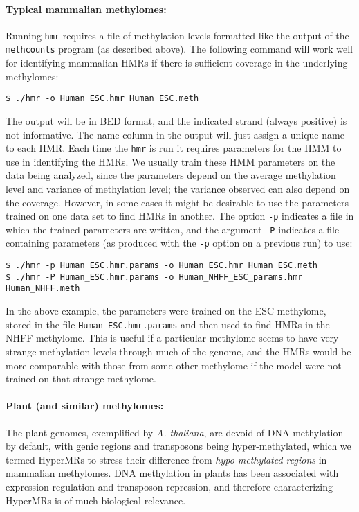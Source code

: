 \documentclass[10pt]{article}
\newcommand{\prog}[1]{\texttt{#1}}
\newcommand{\fn}[1]{\texttt{#1}}
\newcommand{\op}[1]{\texttt{#1}}
\begin{document}
\paragraph{Typical mammalian methylomes:}
Running \prog{hmr} requires a file of methylation levels formatted
like the output of the \prog{methcounts} program (as described
above). The following command will work well for identifying mammalian
HMRs if there is sufficient coverage in the underlying methylomes:
\begin{verbatim}
$ ./hmr -o Human_ESC.hmr Human_ESC.meth
\end{verbatim}
The output will be in BED format, and the indicated strand (always
positive) is not informative. The name column in the output will just
assign a unique name to each HMR. Each time the \prog{hmr} is run it
requires parameters for the HMM to use in identifying the HMRs. We
usually train these HMM parameters on the data being analyzed, since
the parameters depend on the average methylation level and variance of
methylation level; the variance observed can also depend on the
coverage. However, in some cases it might be desirable to use the
parameters trained on one data set to find HMRs in another. The option
\op{-p} indicates a file in which the trained parameters are written,
and the argument \op{-P} indicates a file containing parameters (as
produced with the \op{-p} option on a previous run) to use:
\begin{verbatim}
$ ./hmr -p Human_ESC.hmr.params -o Human_ESC.hmr Human_ESC.meth
$ ./hmr -P Human_ESC.hmr.params -o Human_NHFF_ESC_params.hmr Human_NHFF.meth
\end{verbatim}
In the above example, the parameters were trained on the ESC
methylome, stored in the file \fn{Human\_ESC.hmr.params} and then
used to find HMRs in the NHFF methylome.
This is useful if a particular methylome
seems to have very strange methylation levels through much of the
genome, and the HMRs would be more comparable with those from some
other methylome if the model were not trained on that strange
methylome.



\paragraph{Plant (and similar) methylomes:} 
The plant genomes, exemplified by \textit{A. thaliana}, are devoid of
DNA methylation by default, with genic regions and transposons being
hyper-methylated, which we termed HyperMRs to stress their difference
from \textit{hypo-methylated regions} in mammalian methylomes. DNA
methylation in plants has been associated with expression regulation
and transposon repression, and therefore characterizing HyperMRs is of
much biological relevance.
\end{document}
